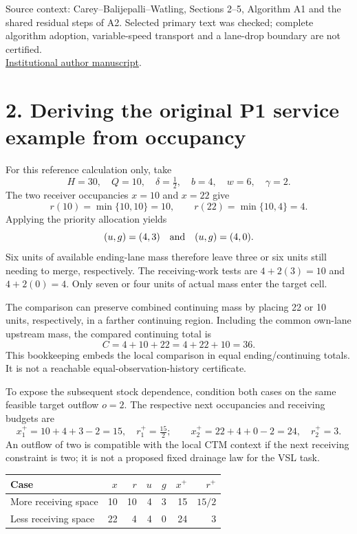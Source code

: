 \documentclass[11pt,a4paper]{article}
\begin{document}
\vfill
Source context: Carey--Balijepalli--Watling, Sections 2--5, Algorithm A1 and
the shared residual steps of A2. Selected primary text was checked; complete
algorithm adoption, variable-speed transport and a lane-drop boundary are not
certified.\\
\href{https://eprints.whiterose.ac.uk/id/eprint/77315/7/Carey\%20et\%20al\%202013_with_coversheet.pdf}{Institutional author manuscript}.

\newpage
\section*{2. Deriving the original P1 service example from occupancy}
For this reference calculation only, take
\[
 H=30,\quad Q=10,\quad\delta=\tfrac12,\quad b=4,\quad w=6,\quad\gamma=2.
\]
The two receiver occupancies $x=10$ and $x=22$ give
\[
 r(10)=\min\{10,10\}=10,\qquad
 r(22)=\min\{10,4\}=4.
\]
Applying the priority allocation yields
\[
 (u,g)=(4,3)\quad\hbox{and}\quad (u,g)=(4,0).
\]
Six units of available ending-lane mass therefore leave three or six units
still needing to merge, respectively. The receiving-work tests are
$4+2(3)=10$ and $4+2(0)=4$. Only seven or four units of actual mass enter
the target cell.

The comparison can preserve combined continuing mass by placing 22 or 10 units,
respectively, in a farther continuing region. Including the common own-lane
upstream mass, the compared continuing total is
\[
 C=4+10+22=4+22+10=36.
\]
This bookkeeping embeds the local comparison in equal ending/continuing totals.
It is not a reachable equal-observation-history certificate.

To expose the subsequent stock dependence, condition both cases on the same
feasible target outflow $o=2$. The respective next occupancies and receiving
budgets are
\[
 x_1^+=10+4+3-2=15,\quad r_1^+=\tfrac{15}{2};\qquad
 x_2^+=22+4+0-2=24,\quad r_2^+=3.
\]
An outflow of two is compatible with the local CTM context if the next
receiving constraint is two; it is not a proposed fixed drainage law for
the VSL task.

\begin{center}
\begin{tabular}{lrrrrrr}
\toprule
Case & $x$ & $r$ & $u$ & $g$ & $x^+$ & $r^+$\\
\midrule
More receiving space & 10 & 10 & 4 & 3 & 15 & $15/2$\\
Less receiving space & 22 & 4 & 4 & 0 & 24 & 3\\
\bottomrule
\end{tabular}
\end{center}
\end{document}
